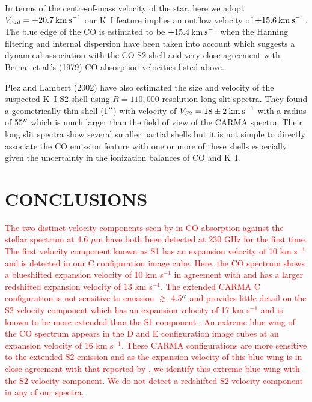 \documentclass[preprint2]{aastex}
\begin{document}
In terms of the centre-of-mass velocity of the star, here we adopt $V_{rad}=+20.7\>{\rm km\>s}^{-1}$ our K~I feature implies an outflow velocity of $+15.6\>{\rm km\>s}^{-1}$. The blue edge of the CO is estimated to be $+15.4\>{\rm km\>s}^{-1}$ when the Hanning filtering and internal dispersion have been taken into account which suggests a dynamical association with the CO S2 shell and very close agreement with Bernat et al.'s (1979) CO absorption velocities listed above.

Plez and Lambert (2002) have also estimated the size and velocity of the suspected K~I S2 shell using $R=110,000$ resolution long slit spectra. They found a geometrically thin shell (1$\mbox{$^{\prime\prime}$}$) with velocity of $V_{S2}=18\pm 2\>{\rm km\>s}^{-1}$ with a radius of 55$\mbox{$^{\prime\prime}$}$ which is much larger than the field of view of the CARMA spectra. Their long slit spectra show several smaller partial shells but it is not simple
to directly associate the CO emission feature with one or more of these shells especially given the uncertainty in the ionization balances of CO and K~I.\section{CONCLUSIONS}
\textcolor{red}{
The two distinct velocity components seen by \cite{1979ApJ...233L.135B} in CO absorption against the stellar spectrum at 4.6 $\mu$m have both been detected at 230 GHz for the first time. The first velocity component known as S1 has an expansion velocity of 10 km s${}^{-1}$ \citep{1979ApJ...233L.135B} and is detected in our C configuration image cube. Here, the CO spectrum shows a blueshifted expansion velocity of 10 km s${}^{-1}$ in agreement with \cite{1979ApJ...233L.135B} and has a larger redshifted expansion velocity of 13 km s${}^{-1}$. The extended CARMA C configuration is not sensitive to emission $\gtrsim$ 4.5$\mbox{$^{\prime\prime}$}$ and provides little detail on the S2 velocity component which has an expansion velocity of 17 km s${}^{-1}$ \citep{1979ApJ...233L.135B} and is known to be more extended than the S1 component \citep{1979ApJ...233L.135B, 1987ApJ...313..400H}. An extreme blue wing of the CO spectrum appears in the D and E configuration image cubes at an expansion velocity of 16 km s${}^{-1}$. These CARMA configurations are more sensitive to the extended S2 emission and as the expansion velocity of this blue wing is in close agreement with that reported by \cite{1979ApJ...233L.135B}, we identify this extreme blue wing with the S2 velocity component. We do not detect a redshifted S2 velocity component in any of our spectra. }
\end{document}
